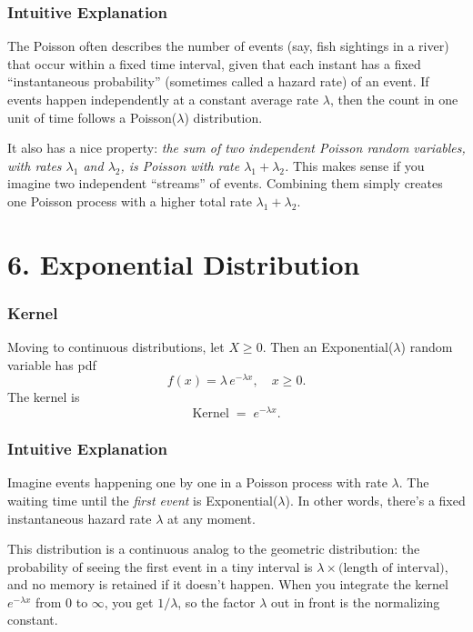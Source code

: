 \documentclass{article}
\begin{document}
\subsubsection*{Intuitive Explanation}
The Poisson often describes the number of events (say, fish sightings in a river) that occur within a fixed time interval, given that each instant has a fixed ``instantaneous probability'' (sometimes called a hazard rate) of an event. If events happen independently at a constant average rate \(\lambda\), then the count in one unit of time follows a Poisson(\(\lambda\)) distribution. 

It also has a nice property: 
\emph{the sum of two independent Poisson random variables, with rates \(\lambda_1\) and \(\lambda_2\), is Poisson with rate \(\lambda_1 + \lambda_2\).}
This makes sense if you imagine two independent ``streams'' of events. 
Combining them simply creates one Poisson process with a higher total rate \(\lambda_1 + \lambda_2\).

\section*{6. Exponential Distribution}

\subsubsection*{Kernel}
Moving to continuous distributions, let \(X \ge 0\). 
Then an Exponential(\(\lambda\)) random variable has pdf
\[
f(x) = \lambda\, e^{-\lambda x}, \quad x \ge 0.
\]
The kernel is
\[
\text{Kernel} \;=\; e^{-\lambda x}.
\]

\subsubsection*{Intuitive Explanation}
Imagine events happening one by one in a Poisson process with rate \(\lambda\). 
The waiting time until the \emph{first event} is Exponential(\(\lambda\)). 
In other words, there's a fixed instantaneous hazard rate \(\lambda\) at any moment. 

This distribution is a continuous analog to the geometric distribution: the probability of seeing the first event in a tiny interval is \(\lambda \times \text{(length of interval)}\), and no memory is retained if it doesn't happen. 
When you integrate the kernel \(e^{-\lambda x}\) from \(0\) to \(\infty\), you get \(1/\lambda\), so the factor \(\lambda\) out in front is the normalizing constant.
\end{document}
